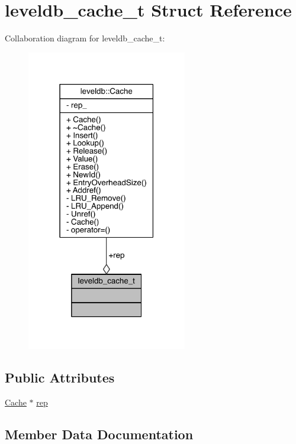 \hypertarget{structleveldb__cache__t}{}\section{leveldb\+\_\+cache\+\_\+t Struct Reference}
\label{structleveldb__cache__t}


Collaboration diagram for leveldb\+\_\+cache\+\_\+t\+:\nopagebreak
\begin{figure}[H]
\begin{center}
\leavevmode
\includegraphics[width=198pt]{structleveldb__cache__t__coll__graph}
\end{center}
\end{figure}
\subsection*{Public Attributes}
\begin{DoxyCompactItemize}
\item 
\hyperlink{classleveldb_1_1_cache}{Cache} $\ast$ \hyperlink{structleveldb__cache__t_a78f74e9a86ea86296e562fe990751a4a}{rep}
\end{DoxyCompactItemize}


\subsection{Member Data Documentation}
\hypertarget{structleveldb__cache__t_a78f74e9a86ea86296e562fe990751a4a}{}
